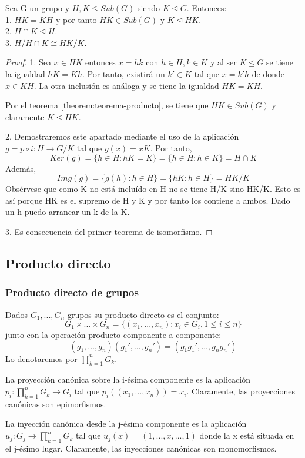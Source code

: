 \begin{nth}
Sea G un grupo y $H,K \le Sub(G)$ siendo $K \trianglelefteq G$. Entonces:\\
1. $HK = KH$ y por tanto $HK \in Sub(G)$ y $K \trianglelefteq HK$.\\
2. $H \cap K \trianglelefteq H$.\\
3. $H/H \cap K \cong HK/K$.
\end{nth}
\begin{proof}
1. Sea $x \in HK$ entonces $x = hk$ con $h \in H, k \in K$ y al ser $K \trianglelefteq G$ se tiene la igualdad $hK = Kh$. Por tanto, existirá un $k' \in K$ tal que $x = k'h$ de donde $x \in KH$. La otra inclusión es análoga y se tiene la igualdad $HK = KH$.

Por el teorema \ref{theorem:teorema-producto}, se tiene que $HK \in Sub(G)$ y claramente $K \trianglelefteq HK$. 

2. Demostraremos este apartado mediante el uso de la aplicación $g=p \circ i: H \rightarrow G/K$ tal que $g(x) = xK$. Por tanto, $$Ker(g) = \{h \in H:hK = K\} = \{h \in H: h \in K\} = H \cap K$$ Además, $$Img(g) = \{g(h):h \in H\} = \{hK: h \in H\} = HK/K$$ Obsérvese que como K no está incluído en H no se tiene H/K sino HK/K. Esto es así porque HK es el supremo de H y K y por tanto los contiene a ambos. Dado un h puedo arrancar un k de la K.
 
3. Es consecuencia del primer teorema de isomorfismo.
\end{proof}

\subsection{Producto directo}

\subsubsection{Producto directo de grupos}

\begin{ndef}
Dados $G_1,...,G_n$ grupos su producto directo es el conjunto: $$G_1 \times ... \times G_n = \{(x_1,...,x_n):x_i \in G_i,1 \le i \le n\}$$ junto con la operación producto componente a componente: $$(g_1,\ldots,g_n)(g_1',\ldots,g_n') = (g_1g_1',\ldots,g_ng_n')$$ Lo denotaremos por $\prod_{k=1}^{n} G_k$.
\end{ndef}

\begin{ndef}
La proyección canónica sobre la i-ésima componente es la aplicación $p_i:\prod_{k=1}^{n} G_k \rightarrow G_i$ tal que $p_i((x_1,...,x_n)) = x_i$. Claramente, las proyecciones canónicas son epimorfismos.

La inyección canónica desde la j-ésima componente es la aplicación $u_j:G_j \rightarrow \prod_{k=1}^{n} G_k$ tal que $u_j(x) = (1,...,x,...,1)$ donde la x está situada en el j-ésimo lugar. Claramente, las inyecciones canónicas son monomorfismos.
\end{ndef}

